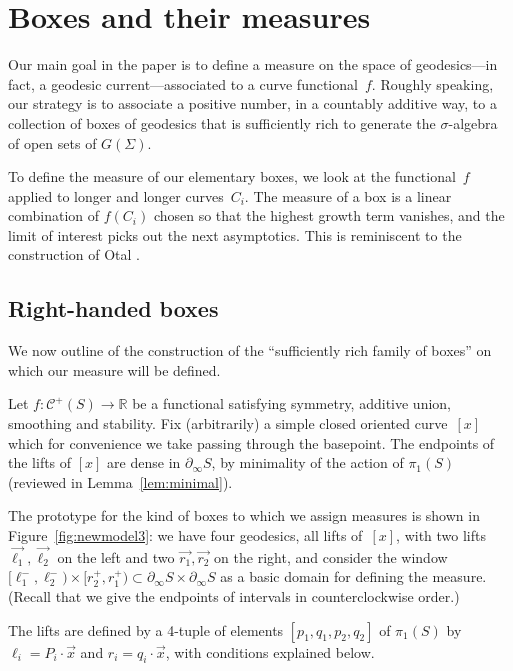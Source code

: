 \documentclass[11pt]{amsart}
\newcommand{\ora}[1]{\overrightarrow{#1}}
\numberwithin{equation}{section}
\numberwithin{figure}{section}
\theoremstyle{definition}
\theoremstyle{plain}
\newcommand{\Curves}{\mathcal{C}}
\begin{document}

\section{Boxes and their measures}
\label{sec:define_measure}
Our main goal in the paper is to define a measure on the space of geodesics---in fact, a geodesic current---associated to a curve functional~$f$. 
Roughly speaking, our strategy is to associate a positive number, in a
countably additive way, to a collection of boxes of geodesics that is 
sufficiently rich to generate the $\sigma$-algebra of open sets of
$G(\Sigma)$.

To define the measure of our elementary boxes, we look at the
functional~$f$ applied to longer and longer curves~$C_i$. The
measure of a box is a linear combination of $f(C_i)$ chosen so that
the highest growth term vanishes, and the limit of interest picks out
the next asymptotics. This is reminiscent to the construction of Otal
\cite{Otal90:SpectreMarqueNegative}.

\subsection{Right-handed boxes}
\label{sec:boxes}

We now outline of the construction of the ``sufficiently rich family of boxes'' on which our measure will be defined.

Let $f\colon \Curves^+(S) \to \mathbb{R}$ be a
functional satisfying symmetry, additive union, smoothing and stability.
Fix
(arbitrarily) a simple closed oriented curve~$[x]$ which for convenience we take passing through the basepoint. The endpoints of the lifts of $[x]$ are dense in
$\partial_\infty S$, by minimality of the action of $\pi_1(S)$
(reviewed in Lemma~\ref{lem:minimal}).

The prototype for
the kind of boxes to which we assign measures is shown in
Figure~\ref{fig:newmodel3}: we have four geodesics, all lifts of~$[x]$, with
two lifts $\ora{\ell_1},\ora{\ell_2}$ on the left and two $\ora{r_1},\ora{r_2}$ on the right,
and consider the window
$[\ell_1^-,\ell_2^-) \times [r_2^+,r_1^+) \subset
\partial_\infty S \times \partial_\infty  S$ as a basic domain
for defining the measure.
(Recall that we give the endpoints of intervals in counterclockwise
order.)

The lifts are defined by a 4-tuple of
elements $[p_1,q_1,p_2,q_2]$ of $\pi_1(S)$ by
$\ell_i = P_i \cdot \ora{x}$ and $r_i = q_i \cdot \ora{x}$, with
conditions explained below.
\end{document}
